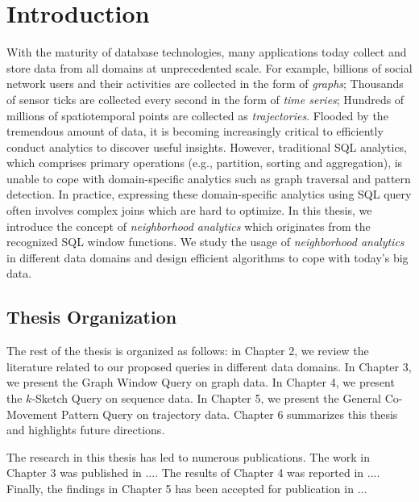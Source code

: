 \chapter{Introduction}
With the maturity of database technologies, many applications today collect and store data from all domains 
at unprecedented scale. For example, billions of 
social network users and their activities are collected in the form
of \emph{graphs}; Thousands of sensor ticks are collected every second
in the form of \emph{time series}; Hundreds of millions of spatiotemporal points
are collected as \emph{trajectories}.
Flooded by the tremendous amount of data, 
it is becoming increasingly critical to efficiently
conduct analytics to discover useful insights.
However, traditional SQL analytics, which comprises 
primary operations (e.g., partition, sorting and aggregation),
is unable to cope  with domain-specific analytics 
such as graph traversal and pattern detection. 
In practice, expressing these domain-specific 
analytics using SQL query often involves 
complex joins which are hard to optimize. 
In this thesis, we introduce the concept of \emph{neighborhood analytics} which
originates from the recognized SQL window functions. We study
the usage of \emph{neighborhood analytics} in different data domains
and design efficient algorithms to cope with today's big data.

%




 


\section{Thesis Organization}
The rest of the thesis is organized as follows: in Chapter 2, we review the literature related
to our proposed queries in different data domains.
In Chapter 3, we present the Graph Window Query on graph data. 
In Chapter 4, we present the $k$-Sketch Query on sequence data.
In Chapter 5, we present the General Co-Movement Pattern Query on trajectory data. 
Chapter 6 summarizes this thesis and highlights future directions.

The research in this thesis has led to numerous publications. The work in Chapter 3 was published in .... The results of Chapter 4 was reported in .... Finally, the findings in Chapter 5 has been accepted for publication  in ...


